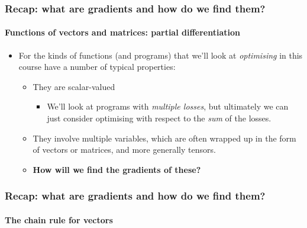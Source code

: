 \documentclass[\beamerclass]{beamer}
\begin{document}
\begin{frame}
\frametitle{Recap: what are gradients and how do we find them?}
\framesubtitle{Functions of vectors and matrices: partial differentiation}
\begin{itemize}
	\item<+-> For the kinds of functions (and programs) that we'll look at \emph{optimising} in this course have a number of typical properties:
	\begin{itemize}
		\item<+-> They are scalar-valued
		\begin{itemize}
			\item We'll look at programs with \emph{multiple losses}, but ultimately we can just consider optimising with respect to the \emph{sum} of the losses.
		\end{itemize}
		\item<+-> They involve multiple variables, which are often wrapped up in the form of vectors or matrices, and more generally tensors.
		\item<+-> \textbf{How will we find the gradients of these?}
	\end{itemize}
\end{itemize}
\end{frame}

\begin{frame}
\frametitle{Recap: what are gradients and how do we find them?}
\framesubtitle{The chain rule for vectors}



\end{frame}
\end{document}
